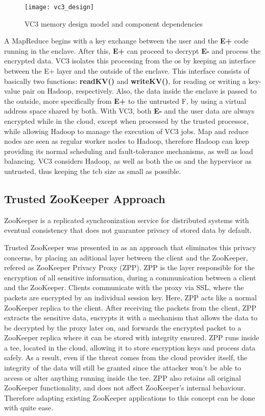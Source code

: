 \begin{figure}[tbp]
	\centering
	{\texttt{[image: vc3\_design]}}
	\caption{VC3 memory design model and component dependencies}
\end{figure}

A MapReduce begins with a key exchange between the user and the \textbf{E+} code running in the enclave. After this, \textbf{E+} can proceed to decrypt \textbf{E-} and process the encrypted data. VC3 isolates this processing from the \gls{os} by keeping an interface between the E+ layer and the outside of the enclave. This interface consists of basically two functions: \textbf{readKV()} and \textbf{writeKV()}, for reading or writing a key-value pair on Hadoop, respectively. Also, the data inside the enclave is passed to the outside, more specifically from \textbf{E+} to the untrusted F, by using a virtual address space shared by both.
With VC3, both \textbf{E-} and the user data are always encrypted while in the cloud, except when processed by the trusted processor, while allowing Hadoop to manage the execution of VC3 jobs. Map and reduce nodes are seen as regular worker nodes to Hadoop, therefore Hadoop can keep providing its normal scheduling and fault-tolerance mechanisms, as well as load balancing. VC3 considers Hadoop, as well as both the \gls{os} and the hypervisor as untrusted, thus keeping the \gls{tcb} size as small as possible.

\subsection{Trusted ZooKeeper Approach}
\label{ssec:protected_zookeeper}

ZooKeeper \cite{zookeeper} is a replicated synchronization service for distributed systems with eventual consistency that does not guarantee privacy of stored data by default. 

Trusted ZooKeeper was presented in \cite{protectedZooKeeper} as an approach that eliminates this privacy concerns, by placing an aditional layer between the client and the ZooKeeper, refered as ZooKeeper Privacy Proxy (ZPP). ZPP is the layer responsible for the encryption of all sensitive information, during a communication between a client and the ZooKeeper. 
Clients communicate with the proxy via SSL, where the packets are encrypted by an individual session key. Here, ZPP acts like a normal ZooKeeper replica to the client. 
After receiving the packets from the client, ZPP extracts the sensitive data, encrypts it with a mechanism that allows the data to be decrypted by the proxy later on, and forwards the encrypted packet to a ZooKeeper replica where it can be stored with integrity ensured.
ZPP runs inside a \gls{tee}, located in the cloud, allowing it to store encryption keys and process data safely. As a result, even if the threat comes from the cloud provider itself, the integrity of the data will still be granted since the attacker won't be able to access or alter anything running inside the \gls{tee}.
ZPP also retains all original ZooKeeper functionality, and does not affect ZooKeeper's internal behaviour. Therefore adapting existing ZooKeeper applications to this concept can be done with quite ease.

